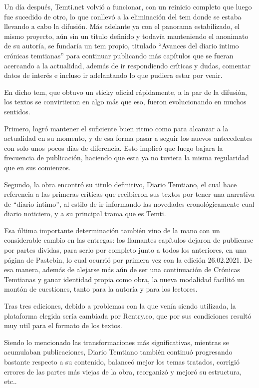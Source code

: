 \documentclass[
  spanish,
]{book}
\begin{document}
Un día después, Temti.net volvió a funcionar, con un reinicio completo que luego fue sucedido de otro, lo que conllevó a la eliminación del tem donde se estaba llevando a cabo la difusión. Más adelante ya con el panorama estabilizado, el mismo proyecto, aún sin un titulo definido y todavía manteniendo el anonimato de su autoría, se fundaría un tem propio, titulado ``Avances del diario intimo crónicas temtianas'' para continuar publicando más capítulos que se fueran acercando a la actualidad, además de ir respondiendo críticas y dudas, comentar datos de interés e incluso ir adelantando lo que pudiera estar por venir.

En dicho tem, que obtuvo un sticky oficial rápidamente, a la par de la difusión, los textos se convirtieron en algo más que eso, fueron evolucionando en muchos sentidos.

Primero, logró mantener el suficiente buen ritmo como para alcanzar a la actualidad en su momento, y de esa forma pasar a seguir los nuevos antecedentes con solo unos pocos días de diferencia. Esto implicó que luego bajara la frecuencia de publicación, haciendo que esta ya no tuviera la misma regularidad que en sus comienzos.

Segundo, la obra encontró su titulo definitivo, Diario Temtiano, el cual hace referencia a las primeras críticas que recibieron sus textos por tener una narrativa de ``diario íntimo'', al estilo de ir informando las novedades cronológicamente cual diario noticiero, y a su principal trama que es Temti.

Esa última importante determinación también vino de la mano con un considerable cambio en las entregas: los flamantes capítulos dejaron de publicarse por partes dividas, para serlo por completo junto a todos los anteriores, en una página de Pastebin, lo cual ocurrió por primera vez con la edición 26.02.2021. De esa manera, además de alejarse más aún de ser una continuación de Crónicas Temtianas y ganar identidad propia como obra, la nueva modalidad facilitó un montón de cuestiones, tanto para la autoría y para los lectores.

Tras tres ediciones, debido a problemas con la que venía siendo utilizada, la plataforma elegida sería cambiada por Rentry.co, que por sus condiciones resultó muy util para el formato de los textos.

Siendo lo mencionado las transformaciones más significativas, mientras se acumulaban publicaciones, Diario Temtiano también continuó progresando bastante respecto a su contenido, balanceó mejor los temas tratados, corrigió errores de las partes más viejas de la obra, reorganizó y mejoró su estructura, etc..
\end{document}
